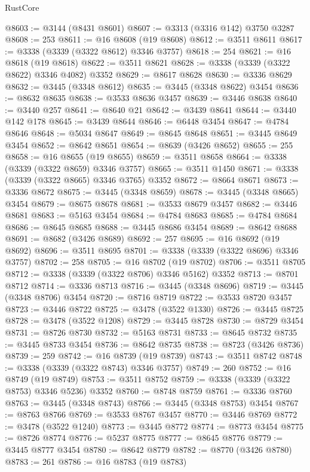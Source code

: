 \begin{lexlean}{RustCore}
\begin{coremodule}
@8603 := @3144 (@8431 @8601)
@8607 := @3313 (@3316 @142) @3750 @3287
@8608 := 253
@8611 := @16 @8608 (@19 @8608)
@8612 := @3511 @8611
@8617 := @3338 (@3339 (@3322 @8612) @3346 @3757)
@8618 := 254
@8621 := @16 @8618 (@19 @8618)
@8622 := @3511 @8621
@8628 := @3338 (@3339 (@3322 @8622) @3346 @4082) @3352
@8629 := @8617 @8628
@8630 := @3336 @8629
@8632 := @3445 (@3348 @8612)
@8635 := @3445 (@3348 @8622) @3454
@8636 := @8632 @8635
@8638 := @3533 @8636 @3457
@8639 := @3446 @8638
@8640 := @3440 @257
@8641 := @8640 @21
@8642 := @3439 @8641
@8644 := @3440 @142 @178
@8645 := @3439 @8644
@8646 := @6448 @3454
@8647 := @4784 @8646
@8648 := @5034 @8647
@8649 := @8645 @8648
@8651 := @3445 @8649 @3454
@8652 := @8642 @8651
@8654 := @8639 (@3426 @8652)
@8655 := 255
@8658 := @16 @8655 (@19 @8655)
@8659 := @3511 @8658
@8664 := @3338 (@3339 (@3322 @8659) @3346 @3757)
@8665 := @3511 @1450
@8671 := @3338 (@3339 (@3322 @8665) @3346 @3765) @3352
@8672 := @8664 @8671
@8673 := @3336 @8672
@8675 := @3445 (@3348 @8659)
@8678 := @3445 (@3348 @8665) @3454
@8679 := @8675 @8678
@8681 := @3533 @8679 @3457
@8682 := @3446 @8681
@8683 := @5163 @3454
@8684 := @4784 @8683
@8685 := @4784 @8684
@8686 := @8645 @8685
@8688 := @3445 @8686 @3454
@8689 := @8642 @8688
@8691 := @8682 (@3426 @8689)
@8692 := 257
@8695 := @16 @8692 (@19 @8692)
@8696 := @3511 @8695
@8701 := @3338 (@3339 (@3322 @8696) @3346 @3757)
@8702 := 258
@8705 := @16 @8702 (@19 @8702)
@8706 := @3511 @8705
@8712 := @3338 (@3339 (@3322 @8706) @3346 @5162) @3352
@8713 := @8701 @8712
@8714 := @3336 @8713
@8716 := @3445 (@3348 @8696)
@8719 := @3445 (@3348 @8706) @3454
@8720 := @8716 @8719
@8722 := @3533 @8720 @3457
@8723 := @3446 @8722
@8725 := @3478 (@3522 @1330)
@8726 := @3445 @8725
@8728 := @3478 (@3522 @1208)
@8729 := @3445 @8728
@8730 := @8729 @3454
@8731 := @8726 @8730
@8732 := @5163 @8731
@8733 := @8645 @8732
@8735 := @3445 @8733 @3454
@8736 := @8642 @8735
@8738 := @8723 (@3426 @8736)
@8739 := 259
@8742 := @16 @8739 (@19 @8739)
@8743 := @3511 @8742
@8748 := @3338 (@3339 (@3322 @8743) @3346 @3757)
@8749 := 260
@8752 := @16 @8749 (@19 @8749)
@8753 := @3511 @8752
@8759 := @3338 (@3339 (@3322 @8753) @3346 @5236) @3352
@8760 := @8748 @8759
@8761 := @3336 @8760
@8763 := @3445 (@3348 @8743)
@8766 := @3445 (@3348 @8753) @3454
@8767 := @8763 @8766
@8769 := @3533 @8767 @3457
@8770 := @3446 @8769
@8772 := @3478 (@3522 @1240)
@8773 := @3445 @8772
@8774 := @8773 @3454
@8775 := @8726 @8774
@8776 := @5237 @8775
@8777 := @8645 @8776
@8779 := @3445 @8777 @3454
@8780 := @8642 @8779
@8782 := @8770 (@3426 @8780)
@8783 := 261
@8786 := @16 @8783 (@19 @8783)

\end{coremodule}
\end{lexlean}
